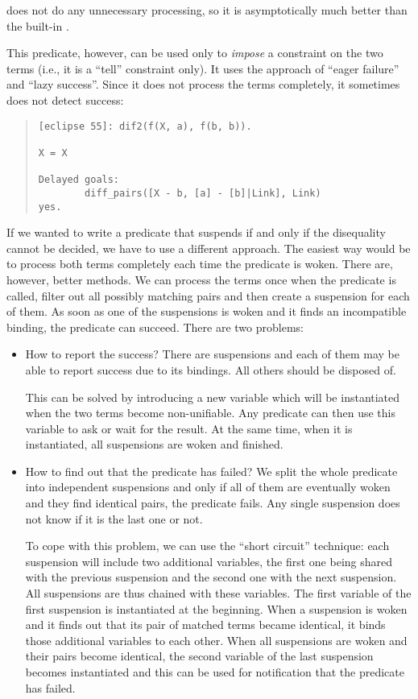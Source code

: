 does not do any unnecessary processing, so it is
asymptotically much better than the built-in .

This predicate, however, can be used only to \emph{impose} a constraint
on the two terms (i.e., it is a ``tell'' constraint only).
It uses the approach of ``eager failure'' and ``lazy success''.
Since it does not process the terms completely, it sometimes
does not detect success:
\begin{quote}
\begin{verbatim}
[eclipse 55]: dif2(f(X, a), f(b, b)).

X = X

Delayed goals:
        diff_pairs([X - b, [a] - [b]|Link], Link)
yes.
\end{verbatim}
\end{quote}
If we wanted to write a predicate that suspends if and only if
the disequality cannot be decided, we have to use a different
approach.
The easiest way would be to process both terms completely each
time the predicate is woken.
There are, however, better methods.
We can process the terms once when the predicate
is called, filter out all possibly matching pairs
and then create a suspension for each of them.
As soon as one of the suspensions is woken and it finds
an incompatible binding, the 
predicate
can succeed.
There are two problems:
\begin{itemize}
\item How to report the success? There are  suspensions
and each of them may be able to report success due to its bindings.
All others should be disposed of.

This can be solved by introducing a new variable
which will be instantiated when the two terms become
non-unifiable. Any predicate can then use this variable
to ask or wait for the result.
At the same time, when it is instantiated, all
suspensions are woken and finished.

\item How to find out that the predicate has failed?
We split the whole predicate into  independent suspensions
and only if all of them are eventually woken and they find identical
pairs, the predicate fails. Any single suspension does not
know if it is the last one or not.

To cope with this problem, we can use the ``short
circuit'' technique:
each suspension will include two additional variables, the first
one being shared with the previous suspension and the second
one with the next suspension.
All suspensions are thus chained with these variables.
The first variable of the first suspension is instantiated
at the beginning.
When a suspension is woken and it finds out that its pair
of matched terms became identical, it binds those additional
variables to each other.
When all suspensions are woken and their pairs become
identical, the second variable of the last suspension
becomes instantiated and this can be used
for notification that the predicate has failed.

\end{itemize}

